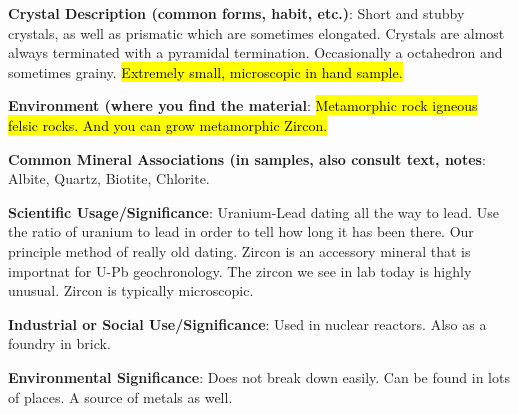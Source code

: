 \documentclass[10pt]{article}
\begin{document}
\begin{framed}
  \textbf{Crystal Description (common forms, habit, etc.)}: Short and stubby crystals, as well as prismatic which are sometimes elongated. Crystals are almost always terminated with a pyramidal termination. Occasionally a octahedron and sometimes grainy. \hl{Extremely small, microscopic in hand sample.}
\end{framed}

\begin{framed}
  \textbf{Environment (where you find the material}: \hl{Metamorphic rock
igneous felsic rocks. And you can grow metamorphic Zircon.}
\end{framed}

\begin{framed}
  \textbf{Common Mineral Associations (in samples, also consult text, notes}: Albite, Quartz, Biotite, Chlorite.
\end{framed}

\begin{framed}
  \textbf{Scientific Usage/Significance}: Uranium-Lead dating all the way to lead. Use the ratio of uranium to lead in order to tell how long it has been there. Our principle method of really old dating. Zircon is an accessory mineral that is importnat for U-Pb geochronology. The zircon we see in lab today is highly unusual. Zircon is typically microscopic.
\end{framed}

\begin{framed}
  \textbf{Industrial or Social Use/Significance}: Used in nuclear reactors. Also as a foundry in brick.
\end{framed}

\begin{framed}
  \textbf{Environmental Significance}: Does not break down easily. Can be found in lots of places. A source of metals as well.
\end{framed}

\end{document}
